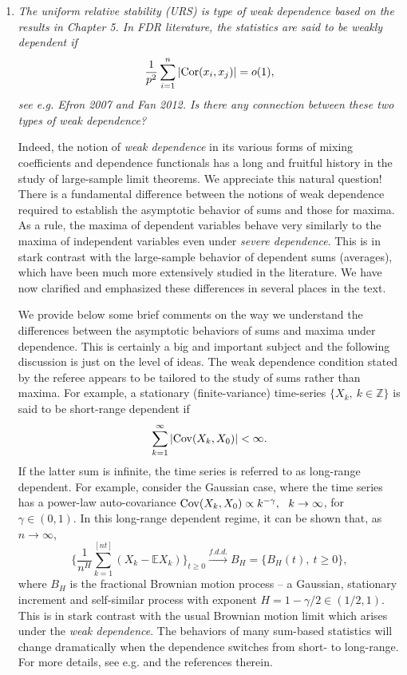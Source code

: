 \documentclass[11pt]{article}
\begin{document}
\begin{enumerate}
        
        \item {\em The uniform relative stability (URS) is type of weak dependence based on the results in Chapter 5. In FDR literature, the statistics are 
        said to be weakly dependent if 
        $$
        \frac{1}{p^2} \sum_{i=1}^n |{\rm Cor}(x_i,x_j)| = o(1),
        $$
see e.g. Efron 2007 and Fan 2012. Is there any connection between these two types of weak dependence?}

   \medskip
   \noindent Indeed, the notion of {\em weak dependence} in its various forms of mixing coefficients and dependence functionals
    has a long and fruitful history in the study of large-sample limit theorems.  We appreciate this natural question!  There is a fundamental 
    difference between the notions of weak dependence required to establish the asymptotic behavior of sums and those for maxima.     
    As a rule, the maxima of dependent variables behave
   very similarly to the maxima of independent variables even under {\em severe dependence}.  This is in stark contrast with the large-sample 
   behavior of dependent sums (averages), which have been much more extensively studied in the literature.  We have now
    clarified and emphasized these differences in several places in the text. 
    
    We provide below some brief comments on the way we understand the differences between the asymptotic behaviors of sums and maxima 
    under dependence.  This is certainly a big and important subject and the following discussion is just on the level of ideas.
    The weak dependence condition stated by the referee appears to be tailored to the study of sums rather than maxima.  For example, a 
    stationary (finite-variance) time-series $\{X_k,\ k\in \mathbb Z\}$ is said to be short-range dependent if
   $$
   \sum_{k=1}^\infty |{\rm Cov} (X_{k}, X_0) | <\infty.
   $$
   If the latter sum is infinite, the time series is referred to as long-range dependent. For example, consider the Gaussian case, where
   the time series has a power-law auto-covariance ${\rm Cov}(X_{k}, X_0) \propto k^{-\gamma},\ \ k\to\infty$, for $\gamma \in (0,1)$.  In this long-range
   dependent regime, it can be shown that, as $n\to\infty$,
  $$
  \Big\{ \frac{1}{n^H} \sum_{k=1}^{[nt]} (X_k -\mathbb E X_k) \Big\}_{t\ge 0} \stackrel{f.d.d.}{\longrightarrow} B_H = \{B_H(t),\ t\ge 0\},
  $$   
  where $B_H$ is the fractional Brownian motion process -- a Gaussian, stationary increment and  self-similar process with 
  exponent $H = 1 - \gamma/2 \in (1/2,1)$.  This is in stark contrast with the usual Brownian motion limit which arises 
  under the {\em weak dependence}.  The behaviors of many sum-based statistics will change dramatically when the dependence switches from
  short- to long-range.  For more details, see e.g. \cite{pipiras:taqqu:2017} and the references therein.
  

\end{enumerate}
\end{document}

